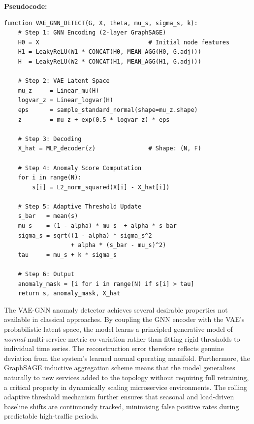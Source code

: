 \noindent\textbf{Pseudocode:}

\begin{verbatim}
function VAE_GNN_DETECT(G, X, theta, mu_s, sigma_s, k):
    # Step 1: GNN Encoding (2-layer GraphSAGE)
    H0 = X                               # Initial node features
    H1 = LeakyReLU(W1 * CONCAT(H0, MEAN_AGG(H0, G.adj)))
    H  = LeakyReLU(W2 * CONCAT(H1, MEAN_AGG(H1, G.adj)))

    # Step 2: VAE Latent Space
    mu_z     = Linear_mu(H)
    logvar_z = Linear_logvar(H)
    eps      = sample_standard_normal(shape=mu_z.shape)
    z        = mu_z + exp(0.5 * logvar_z) * eps

    # Step 3: Decoding
    X_hat = MLP_decoder(z)               # Shape: (N, F)

    # Step 4: Anomaly Score Computation
    for i in range(N):
        s[i] = L2_norm_squared(X[i] - X_hat[i])

    # Step 5: Adaptive Threshold Update
    s_bar   = mean(s)
    mu_s    = (1 - alpha) * mu_s  + alpha * s_bar
    sigma_s = sqrt((1 - alpha) * sigma_s^2
                   + alpha * (s_bar - mu_s)^2)
    tau     = mu_s + k * sigma_s

    # Step 6: Output
    anomaly_mask = [i for i in range(N) if s[i] > tau]
    return s, anomaly_mask, X_hat
\end{verbatim}

\hspace*{0.3in} The VAE-GNN anomaly detector achieves several desirable properties not available in classical approaches. By coupling the GNN encoder with the VAE's probabilistic latent space, the model learns a principled generative model of \textit{normal} multi-service metric co-variation rather than fitting rigid thresholds to individual time series. The reconstruction error therefore reflects genuine deviation from the system's learned normal operating manifold. Furthermore, the GraphSAGE inductive aggregation scheme means that the model generalises naturally to new services added to the topology without requiring full retraining, a critical property in dynamically scaling microservice environments. The rolling adaptive threshold mechanism further ensures that seasonal and load-driven baseline shifts are continuously tracked, minimising false positive rates during predictable high-traffic periods.
